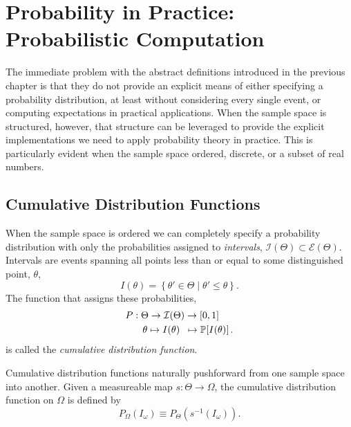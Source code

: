 \chapter{Probability in Practice: \\Probabilistic Computation}

The immediate problem with the abstract definitions introduced in the
previous chapter is that they do not provide an explicit means of either
specifying a probability distribution, at least without considering every 
single event, or computing expectations in practical applications.  When 
the sample space is structured, however, that structure can be leveraged 
to provide the explicit implementations we need to apply probability 
theory in practice.  This is particularly evident when the sample space 
ordered, discrete, or a subset of real numbers.

\section{Cumulative Distribution Functions}

When the sample space is ordered we can completely specify a probability
distribution with only the probabilities assigned to \emph{intervals}, 
$\mathcal{I} \! \left( \Theta \right) \subset \mathcal{E} \! \left( \Theta \right)$.
Intervals are events spanning all points less than or equal to some 
distinguished point, $\theta$,
%
\begin{equation*}
I \! \left( \theta \right) = \left\{ \theta' \in \Theta \mid \theta' \leq \theta \right\}.
\end{equation*}
%
The function that assigns these probabilities,
%
\begin{align*}
P 
&: \Theta \rightarrow \mathcal{I} \! 
\left( \Theta \right) \rightarrow \left[0, 1 \right]
\\
&\quad \theta \mapsto 
I \! \left( \theta \right) \;\; \mapsto 
\mathbb{P} \! \left[ I \! \left( \theta \right) \right].
\end{align*}
%
is called the \emph{cumulative distribution function}.  

Cumulative distribution functions naturally pushforward from one 
sample space into another.  Given a measureable map 
$s : \Theta \rightarrow \Omega$, the cumulative distribution function
on $\Omega$ is defined by
%
\begin{equation*}
P_{\Omega} \! \left( I_{\omega} \right) 
\equiv 
P_{\Theta} \! \left( s^{-1} \! \left( I_{\omega} \right) \right).
\end{equation*}

